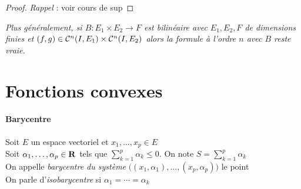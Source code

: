      \medskip
    
    
    \begin{proof} 
    \emph{Rappel} : voir cours de sup 
    \end{proof} \medskip
    
    \emph{Plus généralement, si $B : E_1\times E_2 \rightarrow F$ est bilinéaire avec $E_1,E_2,F$ de dimensions finies et $(f,g) \in {\mathcal{C}}^n(I,E_1)\times{\mathcal{C}}^n(I,E_2)$ alors la formule à l'ordre $n$ avec $B$ reste vraie.} \\
    
    
     \medskip
    
    
\section{Fonctions convexes}
    
    \vspace{-15pt}
    \traitd
    \paragraph{Barycentre}
        Soit $E$ un espace vectoriel et $x_1,\dots ,x_p \in E$ \\
        Soit $\alpha_1 ,\dots ,\alpha_p\in {\mathbf{R}}$ tels que $\sum_{k=1}^p \alpha_k \leqslant 0$. On note $S = \sum_{k=1}^p \alpha_k$\\
        On appelle \emph{barycentre du système} $\big( (x_1,\alpha_1) ,\dots ,(x_p,\alpha_p) \big)$ le point \\
        On parle d'\emph{isobarycentre} si $\alpha_1 = \cdots = \alpha_k$ 
	\trait 
	

